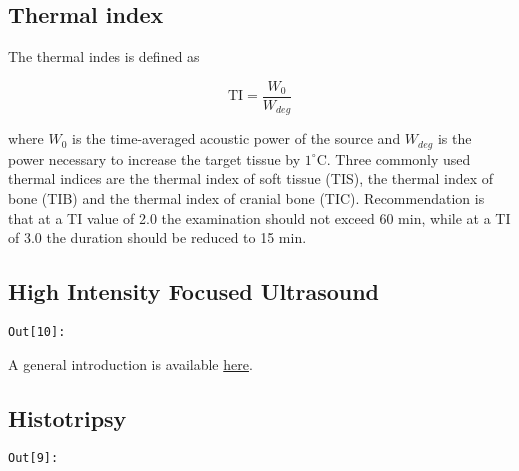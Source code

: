 \documentclass{article}
\begin{document}
    \begin{figure}
        \begin{center}\end{center}
        \caption{}
        \label{}
    \end{figure}
    \subsection{Thermal index}\label{thermal-index}

The thermal indes is defined as

\begin{equation}
\mathrm{TI}=\frac{W_0}{W_{deg}}\label{9.6}\tag{9.6}
\end{equation}

where \(W_0\) is the time-averaged acoustic power of the source and
\(W_{deg}\) is the power necessary to increase the target tissue by
\(1^\circ\)C. Three commonly used thermal indices are the thermal index
of soft tissue (TIS), the thermal index of bone (TIB) and the thermal
index of cranial bone (TIC). Recommendation is that at a TI value of 2.0
the examination should not exceed 60 min, while at a TI of 3.0 the
duration should be reduced to 15 min.
\subsection{High Intensity Focused
Ultrasound}\label{high-intensity-focused-ultrasound}

\texttt{\color{outcolor}Out[{\color{outcolor}10}]:}
    
    \begin{figure}
        \begin{center}\end{center}
        \caption{}
        \label{}
    \end{figure}
    
A general introduction is available
\href{http://www.myvmc.com/treatments/high-intensity-focused-ultrasound-hifu}{here}.
\subsection{Histotripsy}\label{histotripsy}

\texttt{\color{outcolor}Out[{\color{outcolor}9}]:}
    
    \begin{figure}
        \begin{center}\end{center}
        \caption{}
        \label{}
    \end{figure}
    
\end{document}
